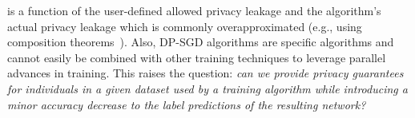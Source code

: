 is a function of the user-defined allowed privacy leakage and the algorithm's actual privacy leakage which is commonly overapproximated (e.g., using composition theorems~\cite{ref_62,ref_63,ref_64}).
Also, DP-SGD algorithms are specific algorithms and cannot easily be combined with other training techniques to leverage parallel advances in training. 
This raises the question: 
\emph{can we provide privacy guarantees for individuals in a given dataset used by a training algorithm while introducing a minor accuracy decrease to the label predictions of the resulting network?}
